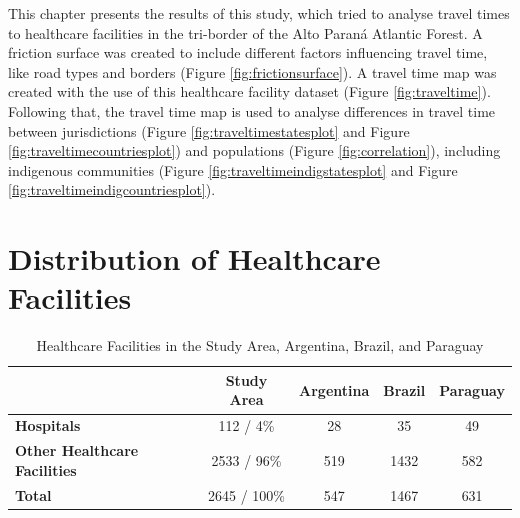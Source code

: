 \documentclass[11pt, a4paper]{report}
\begin{document}
This chapter presents the results of this study, which tried to analyse travel times to healthcare facilities in the tri-border of the Alto Paraná Atlantic Forest. A friction surface was created to include different factors influencing travel time, like road types and borders (Figure \ref{fig:frictionsurface}). A travel time map was created with the use of this healthcare facility dataset (Figure \ref{fig:traveltime}). Following that, the travel time map is used to analyse differences in travel time between jurisdictions (Figure \ref{fig:traveltimestatesplot} and Figure \ref{fig:traveltimecountriesplot}) and populations (Figure \ref{fig:correlation}), including indigenous communities (Figure \ref{fig:traveltimeindigstatesplot} and Figure \ref{fig:traveltimeindigcountriesplot}). 

\section{Distribution of Healthcare Facilities}

\begin{table}[h!]
\caption{Healthcare Facilities in the Study Area, Argentina, Brazil, and Paraguay}
\centering
\begin{tabular}{|l|c|c|c|c|}
\hline
\textbf{} & \textbf{Study Area} & \textbf{Argentina} & \textbf{Brazil} & \textbf{Paraguay} \\ 
\hline
\textbf{Hospitals } & 112 / 4\%  & 28 & 35 & 49 \\ 
\hline
\textbf{Other Healthcare Facilities } & 2533 / 96\% & 519 & 1432 & 582 \\ 
\hline
\textbf{Total} & 2645 / 100\% & 547 & 1467 & 631 \\
\hline
\end{tabular}
\label{table:healthcare_facilities}
\end{table}
\end{document}
